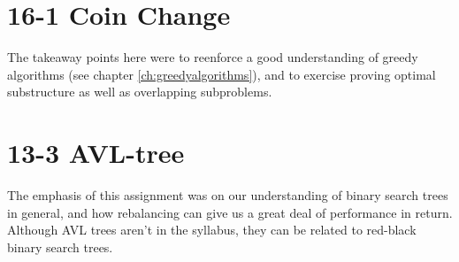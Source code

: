 \section{16-1 Coin Change}
\label{appendix:assignments|ass:coin-change}
The takeaway points here were to reenforce a good understanding of greedy
algorithms (see chapter \ref{ch:greedyalgorithms}), and to exercise proving
optimal substructure as well as overlapping subproblems.

\section{13-3 AVL-tree}
\label{appendix:assignments|ass:avl-tree}
The emphasis of this assignment was on our understanding of binary search
trees in general, and how rebalancing can give us a great deal of performance
in return. Although AVL trees aren't in the syllabus, they can be related to
red-black binary search trees.

